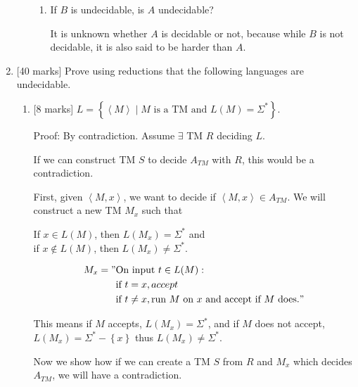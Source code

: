 \documentclass{article}
\newcommand{\set}[1]{{\left\{#1\right\}}}    %
\newcommand{\enc}[1]{\left<#1\right>}
\begin{document}
\begin{enumerate}
\begin{enumerate}
\begin{enumerate}
                    \item If $B$ is undecidable, is $A$ undecidable?

                            It is unknown whether $A$ is decidable or not, because while $B$ is not decidable, it is also said to be harder than $A$.
                \end{enumerate}

        \end{enumerate}
    \item {[40 marks]} Prove using reductions that the following languages are undecidable.

    \begin{enumerate}
    		\item {[8 marks]} $L=\set{\enc{M}\mid M\text{ is a TM and }L(M)=\Sigma^*}$.

            		Proof: By contradiction. Assume $\exists$ TM $R$ deciding $L$.

                    If we can construct TM $S$ to decide $A_{TM}$ with $R$, this would be a contradiction.

                    First, given $\enc{M,x}$, we want to decide if $\enc{M,x} \in A_{TM}$. We will construct a new TM $M_x$ such that

                    If $x \in L(M)$, then $L(M_x) = \Sigma^*$ and \\
                    if $x \not\in L(M)$, then $L(M_x) \neq \Sigma^*$.

                    \begin{equation}
                        \begin{split}
                           M_x = "& \text{On input } t \in L(M): \\
                                  & \text{if } t = x, accept\\
                                  & \text{if } t \neq x, \text{run $M$ on $x$ and accept if $M$ does.}"
                        \end{split}
                    \end{equation}

                    This means if $M$ accepts, $L(M_x) = \Sigma^*$, and if $M$ does not accept, $L(M_x) = \Sigma^* - \set{x}$ thus $L(M_x) \neq \Sigma^*$.

                    Now we show how if we can create a TM $S$ from $R$ and $M_x$ which decides $A_{TM}$, we will have a contradiction.


\end{enumerate}
\end{enumerate}
\end{document}
